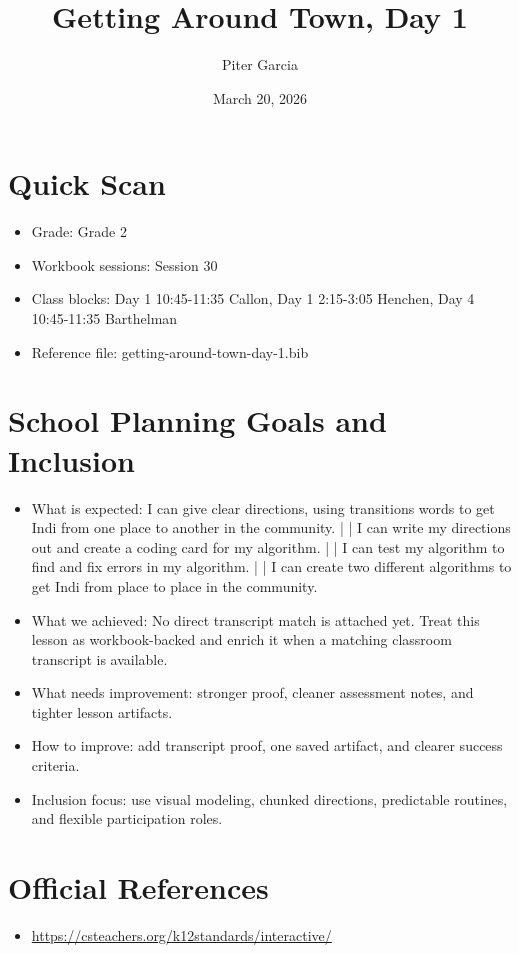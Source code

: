 \documentclass[11pt]{article}
\title{Getting Around Town, Day 1}
\author{Piter Garcia}
\date{March 20, 2026}
\begin{document}
\maketitle
\section*{Quick Scan}
\begin{itemize}[leftmargin=*]
\item Grade: Grade 2
\item Workbook sessions: Session 30
\item Class blocks: Day 1 10:45-11:35 Callon, Day 1 2:15-3:05 Henchen, Day 4 10:45-11:35 Barthelman
\item Reference file: getting-around-town-day-1.bib
\end{itemize}
\section*{School Planning Goals and Inclusion}
\begin{itemize}[leftmargin=*]
\item What is expected: I can give clear directions, using transitions words to get Indi from one place to another in the community. | | I can write my directions out and create a coding card for my algorithm. | | I can test my algorithm to find and fix errors in my algorithm. | | I can create two different algorithms to get Indi from place to place in the community.
\item What we achieved: No direct transcript match is attached yet. Treat this lesson as workbook-backed and enrich it when a matching classroom transcript is available.
\item What needs improvement: stronger proof, cleaner assessment notes, and tighter lesson artifacts.
\item How to improve: add transcript proof, one saved artifact, and clearer success criteria.
\item Inclusion focus: use visual modeling, chunked directions, predictable routines, and flexible participation roles.
\end{itemize}
\section*{Official References}
\begin{itemize}[leftmargin=*]
\item \url{https://csteachers.org/k12standards/interactive/}

\end{itemize}
\end{document}
